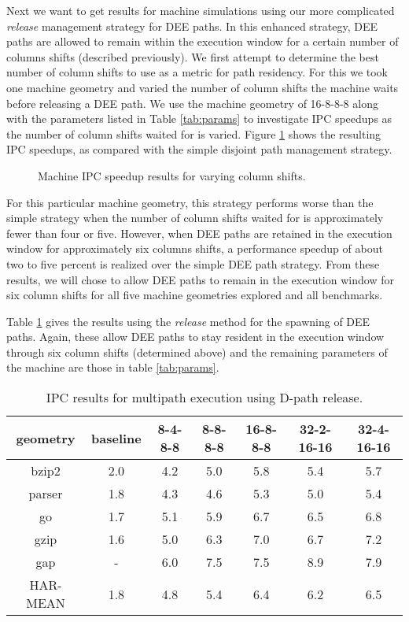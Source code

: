 \documentclass[10pt,dvips]{article}
\begin{document}
Next we want to get results for machine simulations using our
more complicated \textit{release} management strategy for DEE paths.
In this enhanced strategy, DEE paths are allowed to
remain within the execution window for a certain number of
columns shifts (described previously).  We first attempt to
determine the best number of column shifts to use as a metric
for path residency.  For this we took one machine geometry and
varied the number of column shifts the machine waits before releasing
a DEE path.
We use the machine geometry of 16-8-8-8 along with the parameters
listed in Table \ref{tab:params}
to investigate
IPC speedups as the number of column shifts waited for is varied.
Figure \ref{fig:release} shows the resulting IPC speedups,
as compared with the simple disjoint path management strategy.
%
\begin{figure}
\centering
{}
\caption{Machine IPC speedup results for varying 
column shifts.}
\label{fig:release}
\end{figure}
%
For this particular machine geometry, this strategy
performs worse than the simple strategy when the number
of column shifts waited for is 
approximately fewer than four or five.
However, when DEE paths are retained in the
execution window for approximately
six columns shifts,
a performance speedup of about two to five percent is realized
over the simple DEE path strategy.
From these results, we will chose to allow DEE paths
to remain in the execution window for six column shifts
for all five machine geometries explored and all benchmarks.

Table \ref{tab:ipc3} gives the results using the \textit{release} 
method for the spawning of DEE paths.
Again, these allow DEE paths
to stay resident in the execution window through six column shifts
(determined above)
and the remaining parameters of the machine 
are those in table \ref{tab:params}.
%
\begin{table}
\begin{center}
\caption{IPC results for multipath execution using D-path release.}
\label{tab:ipc3}
\begin{tabular}{|c|c|c|c|c|c|c|}
\hline 
geometry&baseline&
8-4-8-8&
8-8-8-8&
16-8-8-8&
32-2-16-16&
32-4-16-16\\
\hline 
\hline
bzip2&2.0&4.2&5.0&5.8&5.4&5.7\\
\hline 
parser&1.8&4.3&4.6&5.3&5.0&5.4\\
\hline 
go&1.7&5.1&5.9&6.7&6.5&6.8\\
\hline 
gzip&1.6&5.0&6.3&7.0&6.7&7.2\\
\hline 
gap&-&6.0&7.5&7.5&8.9&7.9\\
\hline 
\hline 
HAR-MEAN&1.8&4.8&5.4&6.4&6.2&6.5\\
\hline
\end{tabular}
\end{center}
\end{table}
\end{document}
